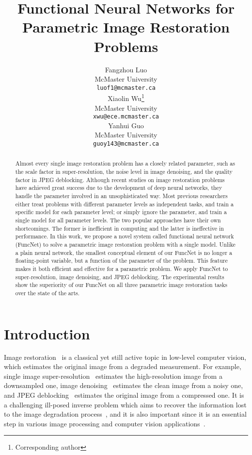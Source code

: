 \documentclass{article}
\title{Functional Neural Networks for\\Parametric Image Restoration Problems}
\author{%
  Fangzhou Luo \\
  McMaster University\\
  \texttt{luof1@mcmaster.ca} \\
  \And
  Xiaolin Wu\thanks{Corresponding author} \\
  McMaster University\\
  \texttt{xwu@ece.mcmaster.ca} \\
  \And
  Yanhui Guo \\
  McMaster University\\
  \texttt{guoy143@mcmaster.ca} \\
}
\begin{document}
\maketitle

\begin{abstract}
Almost every single image restoration problem has a closely related parameter, such as the scale factor in super-resolution, the noise level in image denoising, and the quality factor in JPEG deblocking. Although recent studies on image restoration problems have achieved great success due to the development of deep neural networks, they handle the parameter involved in an unsophisticated way. Most previous researchers either treat problems with different parameter levels as independent tasks, and train a specific model for each parameter level; or simply ignore the parameter, and train a single model for all parameter levels. The two popular approaches have their own shortcomings. The former is inefficient in computing and the latter is ineffective in performance. In this work, we propose a novel system called functional neural network (FuncNet) to solve a parametric image restoration problem with a single model. Unlike a plain neural network, the smallest conceptual element of our FuncNet is no longer a floating-point variable, but a function of the parameter of the problem. This feature makes it both efficient and effective for a parametric problem. We apply FuncNet to super-resolution, image denoising, and JPEG deblocking. The experimental results show the superiority of our FuncNet on all three parametric image restoration tasks over the state of the arts.
\end{abstract}

\section{Introduction}

Image restoration~\cite{milanfar2012tour} is a classical yet still active topic in low-level computer vision, which estimates the original image from a degraded measurement. For example, single image super-resolution~\cite{freeman2000learning} estimates the high-resolution image from a downsampled one, image denoising~\cite{buades2005non} estimates the clean image from a noisy one, and JPEG deblocking~\cite{chang2013reducing} estimates the original image from a compressed one. It is a challenging ill-posed inverse problem which aims to recover the information lost to the image degradation process~\cite{bioucas2007new}, and it is also important since it is an essential step in various image processing and computer vision applications~\cite{zou2011very,yildirim2012novel,bhatia2014super,li2012group,soni2013improved,kwon2015efficient,guo2020deep}.
\end{document}
